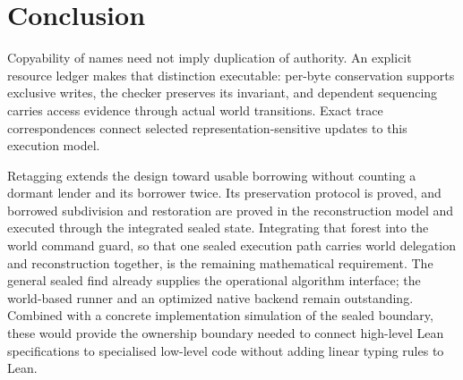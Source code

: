 \documentclass[a4paper,UKenglish,cleveref]{lipics-v2021}
\begin{document}
\section{Conclusion}

Copyability of names need not imply duplication of authority. An explicit
resource ledger makes that distinction executable: per-byte conservation
supports exclusive writes, the checker preserves its invariant, and dependent
sequencing carries access evidence through actual world transitions. Exact
trace correspondences connect selected representation-sensitive updates to
this execution model.

Retagging extends the design toward usable borrowing without counting a dormant
lender and its borrower twice. Its preservation protocol is proved, and borrowed
subdivision and restoration are proved in the reconstruction model and executed
through the integrated sealed state. Integrating that forest into the world
command guard, so that one sealed execution path carries world delegation and
reconstruction together, is the remaining mathematical requirement. The general
sealed find already supplies the operational algorithm interface; the
world-based runner and an optimized native backend remain outstanding. Combined
with a concrete implementation simulation of the sealed boundary, these would
provide the ownership boundary needed to connect high-level Lean specifications
to specialised low-level code without adding linear typing rules to Lean.
\end{document}
